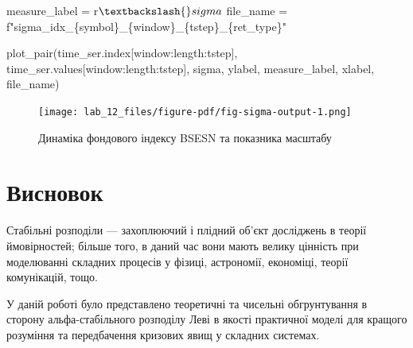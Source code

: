 \documentclass[
  letterpaper,
]{report}
\newenvironment{Shaded}{\begin{snugshade}}{\end{snugshade}}
\newcommand{\NormalTok}[1]{\textcolor[rgb]{0.00,0.23,0.31}{#1}}
\newcommand{\OperatorTok}[1]{\textcolor[rgb]{0.37,0.37,0.37}{#1}}
\newcommand{\SpecialCharTok}[1]{\textcolor[rgb]{0.37,0.37,0.37}{#1}}
\newcommand{\SpecialStringTok}[1]{\textcolor[rgb]{0.13,0.47,0.30}{#1}}
\newcommand{\VerbatimStringTok}[1]{\textcolor[rgb]{0.13,0.47,0.30}{#1}}
\begin{document}
\begin{Shaded}
\begin{Highlighting}[]
\NormalTok{measure\_label }\OperatorTok{=} \VerbatimStringTok{r\textquotesingle{}$\textbackslash{}sigma$\textquotesingle{}}
\NormalTok{file\_name }\OperatorTok{=} \SpecialStringTok{f"sigma\_idx\_}\SpecialCharTok{\{}\NormalTok{symbol}\SpecialCharTok{\}}\SpecialStringTok{\_}\SpecialCharTok{\{}\NormalTok{window}\SpecialCharTok{\}}\SpecialStringTok{\_}\SpecialCharTok{\{}\NormalTok{tstep}\SpecialCharTok{\}}\SpecialStringTok{\_}\SpecialCharTok{\{}\NormalTok{ret\_type}\SpecialCharTok{\}}\SpecialStringTok{"}
\end{Highlighting}
\end{Shaded}

\begin{Shaded}
\begin{Highlighting}[]
\NormalTok{plot\_pair(time\_ser.index[window:length:tstep],}
\NormalTok{          time\_ser.values[window:length:tstep],}
\NormalTok{          sigma, }
\NormalTok{          ylabel, }
\NormalTok{          measure\_label,}
\NormalTok{          xlabel,}
\NormalTok{          file\_name)}
\end{Highlighting}
\end{Shaded}

\begin{figure}[H]

{\centering \texttt{[image: lab\_12\_files/figure-pdf/fig-sigma-output-1.png]}

}

\caption{\label{fig-sigma}Динаміка фондового індексу BSESN та показника
масштабу}

\end{figure}


\hypertarget{ux432ux438ux441ux43dux43eux432ux43eux43a-2}{%
\chapter{Висновок}\label{ux432ux438ux441ux43dux43eux432ux43eux43a-2}}

Стабільні розподіли --- захоплюючий і плідний об'єкт досліджень в теорії
ймовірностей; більше того, в даний час вони мають велику цінність при
моделюванні складних процесів у фізиці, астрономії, економіці, теорії
комунікацій, тощо.

У даній роботі було представлено теоретичні та чисельні обгрунтування в
сторону альфа-стабільного розподілу Леві в якості практичної моделі для
кращого розуміння та передбачення кризових явищ у складних системах.
\end{document}
